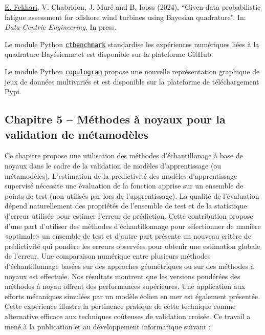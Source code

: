 \medskip
\noindent
{} \underline{E. Fekhari}, V. Chabridon, J. Mur\'{e} and B. Iooss (2024). ``Given-data probabilistic fatigue assessment for offshore wind turbines using Bayesian quadrature''. In: \textit{Data-Centric Engineering}, In press.

\medskip
\noindent
{} Le module Python \href{https://github.com/efekhari27/ctbenchmark}{\texttt{ctbenchmark}} standardise les exp\'{e}riences num\'{e}riques li\'{e}es à la quadrature Bay\'{e}sienne et est disponible sur la plateforme GitHub.

\medskip
\noindent
{} Le module Python \href{https://github.com/efekhari27/copulogram}{\texttt{copulogram}} propose une nouvelle repr\'{e}sentation graphique de jeux de donn\'{e}es multivari\'{e}s et est disponible sur la plateforme de t\'{e}l\'{e}chargement Pypi.



\subsection*{Chapitre 5 -- M\'{e}thodes à noyaux pour la validation de m\'{e}tamodèles}

Ce chapitre propose une utilisation des m\'{e}thodes d'\'{e}chantillonage à base de noyaux dans le cadre de la validation de modèles d'apprentissage (ou m\'{e}tamodèles). 
L'estimation de la pr\'{e}dictivit\'{e} des modèles d'apprentissage supervis\'{e} n\'{e}cessite une \'{e}valuation de la fonction apprise sur un ensemble de points de test (non utilis\'{e}s par lors de l'apprentissage). 
La qualit\'{e} de l'\'{e}valuation d\'{e}pend naturellement des propri\'{e}t\'{e}s de l'ensemble de test et de la statistique d'erreur utilis\'{e}e pour estimer l'erreur de pr\'{e}diction. 
Cette contribution propose d'une part d'utiliser des m\'{e}thodes d'\'{e}chantillonnage pour s\'{e}lectionner de manière «optimale» un ensemble de test et d'autre part pr\'{e}sente un nouveau critère de pr\'{e}dictivit\'{e} qui pondère les erreurs observ\'{e}es pour obtenir une estimation globale de l'erreur. 
Une comparaison num\'{e}rique entre plusieurs m\'{e}thodes d'\'{e}chantillonnage bas\'{e}es sur des approches g\'{e}om\'{e}triques \citep{shang_apley_2020} ou sur des m\'{e}thodes à noyaux \citep{chen_welling_2010,mak_joseph_2018} est effectu\'{e}e. 
Nos r\'{e}sultats montrent que les versions pond\'{e}r\'{e}es des m\'{e}thodes à noyau offrent des performances sup\'{e}rieures. 
Une application aux efforts m\'{e}caniques simul\'{e}es par un modèle \'{e}olien en mer est \'{e}galement pr\'{e}sent\'{e}e. 
Cette exp\'{e}rience illustre la pertinence pratique de cette technique comme alternative efficace aux techniques coûteuses de validation crois\'{e}e. 
Ce travail a men\'{e} à la publication et au d\'{e}veloppement informatique suivant : 

